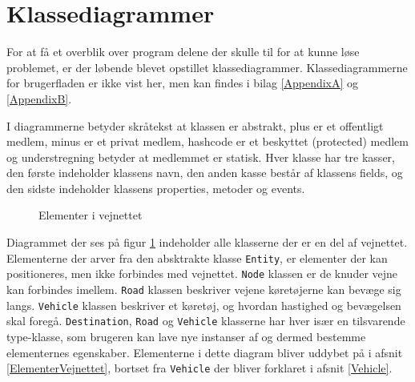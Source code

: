 \section{Klassediagrammer}\label{Klassediagrammer}

For at få et overblik over program delene der skulle til for at kunne løse problemet, er der løbende blevet opstillet klassediagrammer. Klassediagrammerne for brugerfladen er ikke vist her, men kan findes i bilag \ref{AppendixA} og \ref{AppendixB}.

\vspace{5mm}

I diagrammerne betyder skråtekst at klassen er abstrakt, plus er et offentligt medlem, minus er et privat medlem, hashcode er et beskyttet (protected) medlem og understregning betyder at medlemmet er statisk. Hver klasse har tre kasser, den første indeholder klassens navn, den anden kasse består af klassens fields, og den sidste indeholder klassens properties, metoder og events.

\begin{figure}[H]
    \centering
    \caption{Elementer i vejnettet}
    \label{kdVejElementer}
\end{figure}

Diagrammet der ses på figur \ref{kdVejElementer} indeholder alle klasserne der er en del af vejnettet. Elementerne der arver fra den absktrakte klasse \texttt{Entity}, er elementer der kan positioneres, men ikke forbindes med vejnettet. \texttt{Node} klassen er de knuder vejne kan forbindes imellem. \texttt{Road} klassen beskriver vejene køretøjerne kan bevæge sig langs. \texttt{Vehicle} klassen beskriver et køretøj, og hvordan hastighed og bevægelsen skal foregå. \texttt{Destination}, \texttt{Road} og \texttt{Vehicle} klasserne har hver især en tilsvarende type-klasse, som brugeren kan lave nye instanser af og dermed bestemme elementernes egenskaber. Elementerne i dette diagram bliver uddybet på i afsnit \ref{ElementerVejnettet}, bortset fra \texttt{Vehicle} der bliver forklaret i afsnit \ref{Vehicle}.

